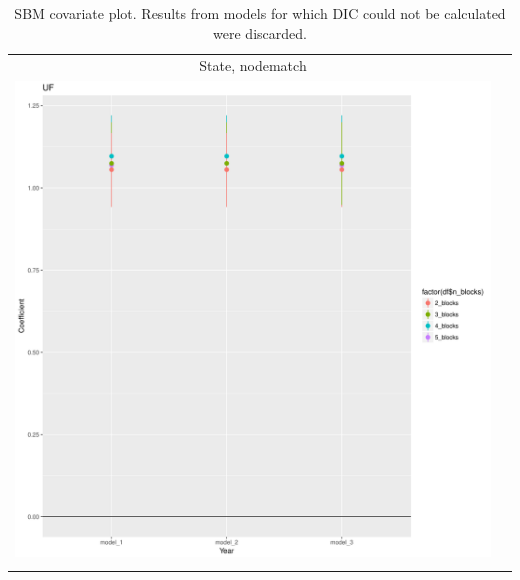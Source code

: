 \documentclass[fleqn,12pt]{wlscirep}
\begin{document}
\clearpage
\begin{longtable}[!h]{c@{\hskip 0cm}c}
State, nodematch \\
\includegraphics[height=.75\textheight, clip=true, trim=.5cm .5cm 0cm .6cm]{figures/rl_plots1/UF.pdf}   \\
\caption{\label{fig:SBM_plot_nwpol} SBM covariate plot. Results from models for which DIC could not be calculated were discarded.}
\end{longtable}
\end{document}
